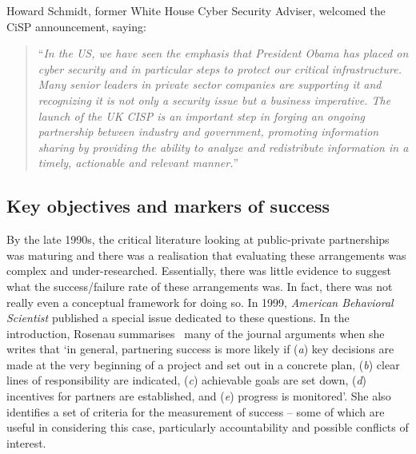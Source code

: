 \documentclass[a4paper,11pt]{article}
\begin{document}
Howard Schmidt, former White House Cyber Security Adviser, welcomed
the CiSP announcement, saying:

\begin{quotation}
\noindent ``{\emph{In the US, we have seen the emphasis that President Obama has
placed on cyber security and in particular steps to protect our
critical infrastructure. Many senior leaders in private sector
companies are supporting it and recognizing it is not only a security
issue but a business imperative. The launch of the UK CISP is an
important step in forging an ongoing partnership between industry and
government, promoting information sharing by providing the ability to
analyze and redistribute information in a timely, actionable and
relevant manner.}}''
\end{quotation}


\subsection{Key objectives and markers of success}

By the late 1990s, the critical literature looking at public-private
partnerships was maturing and there was a realisation that evaluating
these arrangements was complex and under-researched. Essentially,
there was little evidence to suggest what the success/failure rate of
these arrangements was. In fact, there was not really even a
conceptual framework for doing so. In 1999, {\emph{American
Behavioral Scientist}} published a special issue dedicated to these
questions. In the introduction, Rosenau summarises~\cite{rosenau:1999}
many of the journal arguments when she writes that `in general,
partnering success is more likely if ({\emph{a}}) key decisions are
made at the very beginning of a project and set out in a concrete
plan, ({\emph{b}}) clear lines of responsibility are indicated,
({\emph{c}}) achievable goals are set down, ({\emph{d}}) incentives
for partners are established, and ({\emph{e}}) progress is
monitored'. She also identifies a set of criteria for the measurement
of success -- some of which are useful in considering this case,
particularly accountability and possible conflicts of interest.
\end{document}
